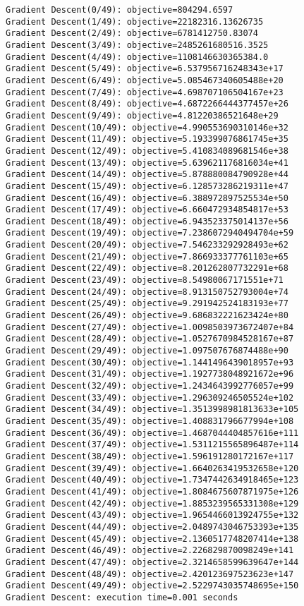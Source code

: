\documentclass[11pt]{article}
\begin{document}
    \begin{Verbatim}[commandchars=\\\{\}]
Gradient Descent(0/49): objective=804294.6597
Gradient Descent(1/49): objective=22182316.13626735
Gradient Descent(2/49): objective=6781412750.83074
Gradient Descent(3/49): objective=2485261680516.3525
Gradient Descent(4/49): objective=1108146630365384.0
Gradient Descent(5/49): objective=6.537956716248343e+17
Gradient Descent(6/49): objective=5.085467340605488e+20
Gradient Descent(7/49): objective=4.698707106504167e+23
Gradient Descent(8/49): objective=4.6872266444377457e+26
Gradient Descent(9/49): objective=4.81220386521648e+29
Gradient Descent(10/49): objective=4.990553690310146e+32
Gradient Descent(11/49): objective=5.193399076861745e+35
Gradient Descent(12/49): objective=5.410834089681546e+38
Gradient Descent(13/49): objective=5.639621176816034e+41
Gradient Descent(14/49): objective=5.878880084790928e+44
Gradient Descent(15/49): objective=6.128573286219311e+47
Gradient Descent(16/49): objective=6.388972897525534e+50
Gradient Descent(17/49): objective=6.660472934854817e+53
Gradient Descent(18/49): objective=6.943523375014137e+56
Gradient Descent(19/49): objective=7.2386072940494704e+59
Gradient Descent(20/49): objective=7.546233292928493e+62
Gradient Descent(21/49): objective=7.866933377761103e+65
Gradient Descent(22/49): objective=8.201262807732291e+68
Gradient Descent(23/49): objective=8.54980067171551e+71
Gradient Descent(24/49): objective=8.913150752793004e+74
Gradient Descent(25/49): objective=9.291942524183193e+77
Gradient Descent(26/49): objective=9.686832221623424e+80
Gradient Descent(27/49): objective=1.0098503973672407e+84
Gradient Descent(28/49): objective=1.0527670984528167e+87
Gradient Descent(29/49): objective=1.097507676874488e+90
Gradient Descent(30/49): objective=1.1441496439018957e+93
Gradient Descent(31/49): objective=1.1927738048921672e+96
Gradient Descent(32/49): objective=1.2434643992776057e+99
Gradient Descent(33/49): objective=1.296309246505524e+102
Gradient Descent(34/49): objective=1.3513998981813633e+105
Gradient Descent(35/49): objective=1.408831796677994e+108
Gradient Descent(36/49): objective=1.4687044404857616e+111
Gradient Descent(37/49): objective=1.5311215565896487e+114
Gradient Descent(38/49): objective=1.596191280172167e+117
Gradient Descent(39/49): objective=1.6640263419532658e+120
Gradient Descent(40/49): objective=1.7347442634918465e+123
Gradient Descent(41/49): objective=1.8084675607871975e+126
Gradient Descent(42/49): objective=1.8853239565331308e+129
Gradient Descent(43/49): objective=1.9654466013924755e+132
Gradient Descent(44/49): objective=2.0489743046753393e+135
Gradient Descent(45/49): objective=2.1360517748207414e+138
Gradient Descent(46/49): objective=2.226829870098249e+141
Gradient Descent(47/49): objective=2.3214658599639647e+144
Gradient Descent(48/49): objective=2.420123697523623e+147
Gradient Descent(49/49): objective=2.5229743035748695e+150
Gradient Descent: execution time=0.001 seconds
    \end{Verbatim}
\end{document}
